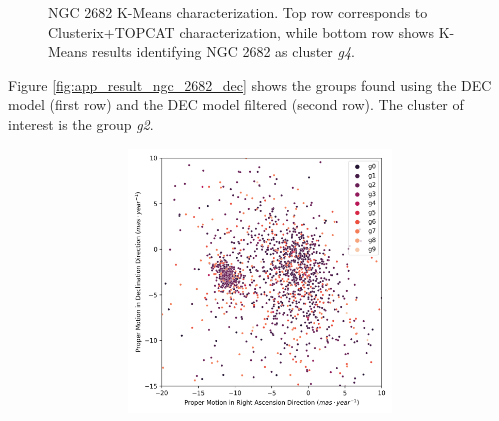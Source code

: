 \documentclass[11pt,a4paper,english,twocolumn]{article}
\begin{document}
\begin{figure}[htbp]
\begin{subfigure}{\columnwidth}
\begin{subfigure}[t]{0.30\textwidth}
    \end{subfigure}
  \end{subfigure}
  \caption{NGC 2682 K-Means characterization.
           Top row corresponds to Clusterix+TOPCAT characterization,
           while bottom row shows K-Means results identifying
           NGC 2682 as cluster \emph{g4}.}
  \label{fig:app_result_ngc_2682_clusterix_kmeans}
\end{figure}

Figure \ref{fig:app_result_ngc_2682_dec} shows the groups found using
the DEC model (first row) and the DEC model filtered (second row).
The cluster of interest is the group \emph{g2}.

\begin{figure}[htbp]
  \centering
  \begin{subfigure}{\columnwidth}
    \centering
    \begin{subfigure}[t]{0.30\textwidth}
      \centering
      \includegraphics[width=\textwidth]{../figures/ngc_2682/dec_pm_ngc_2682.png}
    \end{subfigure}
    \hfill
    \begin{subfigure}[t]{0.30\textwidth}
      \centering

\end{subfigure}
\end{subfigure}
\end{figure}
\end{document}

